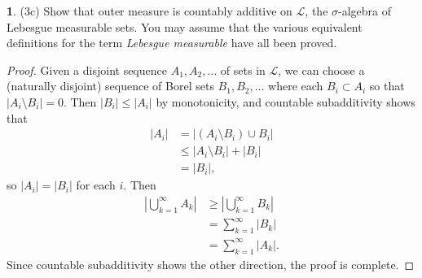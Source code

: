 \documentclass[12pt]{article}
\theoremstyle{definition}
\newtheorem{ex}{}
\begin{document}
\begin{ex}
	(3c)
	Show that outer measure is countably additive on $\mathcal{L}$, the $\sigma$-algebra of Lebesgue measurable sets.
	You may assume that the various equivalent definitions for the term \textit{Lebesgue measurable} have all been proved.
\end{ex}
\begin{proof}
	Given a disjoint sequence $A_1, A_2, \dots$ of sets in $\mathcal{L}$, we can choose a (naturally disjoint) sequence of Borel sets $B_1, B_2, \dots$ where each $B_i \subset A_i$ so that $|A_i \setminus B_i| = 0$.
	Then $|B_i| \leq |A_i|$ by monotonicity, and countable subadditivity shows that \begin{align*}
		|A_i| & = |(A_i \setminus B_i) \cup B_i| \\
		      & \leq |A_i \setminus B_i| + |B_i|    \\
          & = |B_i|,
	\end{align*}
	so $|A_i| = |B_i|$ for each $i$.
  Then \begin{align*}
		\left| \bigcup_{k=1}^\infty A_k \right| & \geq \left| \bigcup_{k=1}^\infty B_k \right| \\
		                                        & = \sum_{k=1}^\infty |B_k|                    \\
		                                        & = \sum_{k=1}^\infty |A_k|.
	\end{align*}
	Since countable subadditivity shows the other direction, the proof is complete.
\end{proof}
\end{document}
